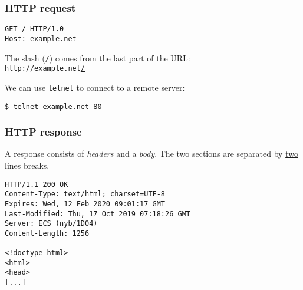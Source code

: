 \documentclass{beamer}
\begin{document}
	\begin{frame}[fragile]
		\frametitle{HTTP request}

		\begin{lstlisting}
GET / HTTP/1.0
Host: example.net\end{lstlisting}

		The slash (\texttt{/}) comes from the last part of the URL: \\
		\texttt{http://example.net\underline{/}}

		We can use \texttt{telnet} to connect to a remote server:
		\begin{lstlisting}
$ telnet example.net 80\end{lstlisting}
	\end{frame}

	\begin{frame}[fragile]
		\frametitle{HTTP response}

		A response consists of \emph{headers} and a \emph{body}. The two sections are separated by \underline{two} lines breaks.

		\begin{lstlisting}
HTTP/1.1 200 OK
Content-Type: text/html; charset=UTF-8
Expires: Wed, 12 Feb 2020 09:01:17 GMT
Last-Modified: Thu, 17 Oct 2019 07:18:26 GMT
Server: ECS (nyb/1D04)
Content-Length: 1256

<!doctype html>
<html>
<head>
[...]\end{lstlisting}
	\end{frame}
\end{document}
